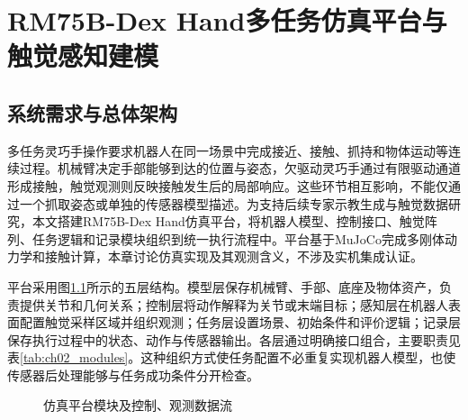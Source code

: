\chapter{RM75B-Dex Hand多任务仿真平台与触觉感知建模}
\label{chap:simulation_platform}

\section{系统需求与总体架构}
\label{sec:platform_architecture}

多任务灵巧手操作要求机器人在同一场景中完成接近、接触、抓持和物体运动等连续过程。机械臂决定手部能够到达的位置与姿态，欠驱动灵巧手通过有限驱动通道形成接触，触觉观测则反映接触发生后的局部响应。这些环节相互影响，不能仅通过一个抓取姿态或单独的传感器模型描述。为支持后续专家示教生成与触觉数据研究，本文搭建RM75B-Dex Hand仿真平台，将机器人模型、控制接口、触觉阵列、任务逻辑和记录模块组织到统一执行流程中。平台基于MuJoCo完成多刚体动力学和接触计算\cite{todorov2012mujoco}，本章讨论仿真实现及其观测含义，不涉及实机集成认证。

平台采用图\ref{fig:ch02_architecture}所示的五层结构。模型层保存机械臂、手部、底座及物体资产，负责提供关节和几何关系；控制层将动作解释为关节或末端目标；感知层在机器人表面配置触觉采样区域并组织观测；任务层设置场景、初始条件和评价逻辑；记录层保存执行过程中的状态、动作与传感器输出。各层通过明确接口组合，主要职责见表\ref{tab:ch02_modules}。这种组织方式使任务配置不必重复实现机器人模型，也使传感器后处理能够与任务成功条件分开检查。

\begin{figure}[htbp]
  \centering
  \caption{仿真平台模块及控制、观测数据流}
  \label{fig:ch02_architecture}
\end{figure}

